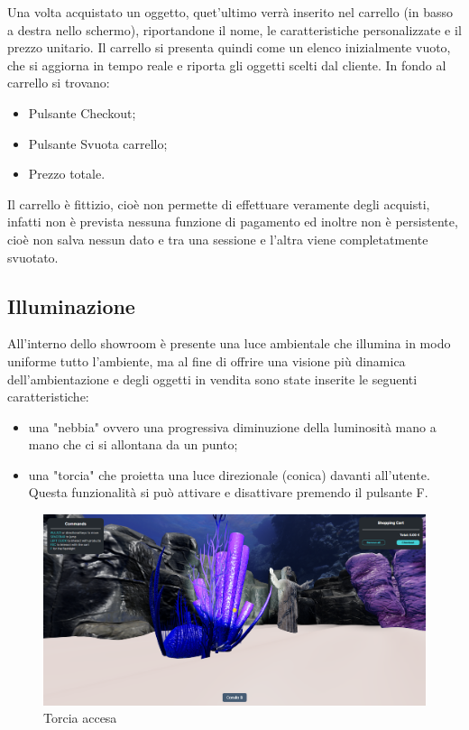 Una volta acquistato un oggetto, quet'ultimo verrà inserito nel carrello (in basso a destra nello schermo), riportandone il nome, le caratteristiche personalizzate e il prezzo unitario.
Il carrello si presenta quindi come un elenco inizialmente vuoto, che si aggiorna in tempo reale e riporta gli oggetti scelti dal cliente.
In fondo al carrello si trovano:
\begin{itemize}
	\item Pulsante Checkout;
	\item Pulsante Svuota carrello;
	\item Prezzo totale.
\end{itemize}
Il carrello è fittizio, cioè non permette di effettuare veramente degli acquisti, infatti non è prevista nessuna funzione di pagamento ed inoltre non è persistente, cioè non salva nessun dato e tra una sessione e l'altra viene completatmente svuotato.
\pagebreak

\subsection{Illuminazione}
All'interno dello showroom è presente una luce ambientale che illumina in modo uniforme tutto l'ambiente, ma al fine di offrire una visione più dinamica dell'ambientazione e degli oggetti in vendita sono state inserite le seguenti caratteristiche:
\begin{itemize}
	\item una "nebbia" ovvero una progressiva diminuzione della luminosità mano a mano che ci si allontana da un punto;
	\item una "torcia" che proietta una luce direzionale (conica) davanti all'utente. Questa funzionalità si può attivare e disattivare premendo il pulsante F.
\end{itemize}

\begin{figure}[H]
  \renewcommand{\thefigure}{8}
  \includegraphics[width=\linewidth]{./res/images/torcia.png}
  \caption{Torcia accesa}
  \label{Torcia acccesa}
\end{figure}


